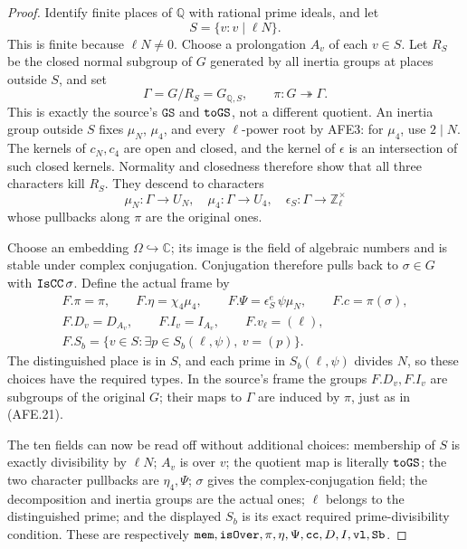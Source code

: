 \documentclass[11pt,a4paper]{article}
\numberwithin{equation}{section}
\theoremstyle{remark}\newtheorem{remark}[theorem]{Remark}
\begin{document}
\begin{proof}
Identify finite places of \(\mathbb Q\) with rational
prime ideals, and let
\[
       S=\{v:v\mid\ell N\}.
 \]
This is finite because \(\ell N\ne0\).
Choose a prolongation \(A_v\) of each \(v\in S\).
Let \(R_S\) be the closed normal subgroup of \(G\)
generated by all inertia groups at places outside
\(S\), and set
\[
       \Gamma=G/R_S=G_{\mathbb Q,S},\qquad
       \pi:G\twoheadrightarrow\Gamma.
 \]
This is exactly the source's \(\texttt{GS}\) and
\(\texttt{to\allowbreak GS}\), not a different quotient.
An inertia group outside \(S\) fixes \(\mu_N\),
\(\mu_4\), and every \(\ell\)-power root by AFE3:
for \(\mu_4\), use \(2\mid N\).
The kernels of \(c_N,c_4\) are open and closed,
and the kernel of \(\epsilon\) is an intersection
of such closed kernels.  Normality and closedness
therefore show that all three characters kill \(R_S\).
They descend to characters
\[
       \mu_N:\Gamma\to U_N,\quad
       \mu_4:\Gamma\to U_4,\quad
       \epsilon_S:\Gamma\to\mathbb Z_\ell^\times
 \]
whose pullbacks along \(\pi\) are the original ones.

Choose an embedding \(\Omega\hookrightarrow\mathbb C\);
its image is the field of algebraic numbers and is
stable under complex conjugation.
Conjugation therefore pulls back to
\(\sigma\in G\) with \(\texttt{Is\allowbreak CC}\,\sigma\).
Define the actual frame by
\[
 \begin{gathered}
 F.\pi=\pi,\qquad F.\eta=\chi_4\mu_4,\qquad
 F.\Psi=\epsilon_S^e\,\psi\mu_N,\qquad F.c=\pi(\sigma),\\
 F.D_v=D_{A_v},\qquad F.I_v=I_{A_v},\qquad
 F.v_\ell=(\ell),\\
 F.S_b=\{v\in S:\exists p\in S_b(\ell,\psi),\ v=(p)\}.
 \end{gathered}                                         \tag{AFE.21}
\]
The distinguished place is in \(S\), and each prime
in \(S_b(\ell,\psi)\) divides \(N\), so these choices
have the required types.
In the source's frame the groups \(F.D_v,F.I_v\)
are subgroups of the original \(G\); their maps to
\(\Gamma\) are induced by \(\pi\), just as in (AFE.21).

The ten fields can now be read off without additional
choices: membership of \(S\) is exactly divisibility
by \(\ell N\); \(A_v\) is over \(v\);
the quotient map is literally \(\texttt{to\allowbreak GS}\);
the two character pullbacks are \(\eta_4,\Psi\);
\(\sigma\) gives the complex-conjugation field;
the decomposition and inertia groups are the actual
ones; \(\ell\) belongs to the distinguished prime;
and the displayed \(S_b\) is its exact required
prime-divisibility condition.
These are respectively
\(\texttt{mem},\texttt{is\allowbreak Over},\pi,\eta,\Psi,
\texttt{cc},D,I,\texttt{vl},\texttt{Sb}\).
\end{proof}
\end{document}
